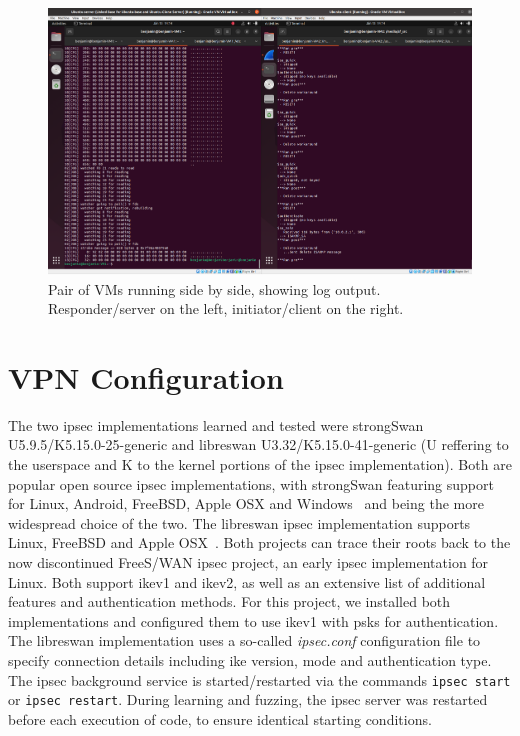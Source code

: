 \begin{figure}
	\centering
	\includegraphics[width=\linewidth]{images/VM_setup}
	\caption{Pair of VMs running side by side, showing log output. Responder/server on the left, initiator/client on the right.}
	\label{fig:vmsetup}
\end{figure}


\section{VPN Configuration} \label{sec:vpn_setup}
The two \ac{ipsec} implementations learned and tested were strongSwan U5.9.5/K5.15.0-25-generic and libreswan U3.32/K5.15.0-41-generic (U reffering to the userspace and K to the kernel portions of the ipsec implementation). Both are popular open source \ac{ipsec} implementations, with strongSwan featuring support for Linux, Android, FreeBSD, Apple OSX and Windows~\cite{doc:strongswan} and being the more widespread choice of the two. The libreswan \ac{ipsec} implementation supports Linux, FreeBSD and Apple OSX~\cite{doc:libreswan}. Both projects can trace their roots back to the now discontinued FreeS/WAN \ac{ipsec} project, an early \ac{ipsec} implementation for Linux. Both support \ac{ike}v1 and \ac{ike}v2, as well as an extensive list of additional features and authentication methods. For this project, we installed both implementations and configured them to use \ac{ike}v1 with \acp{psk} for authentication. The libreswan implementation uses a so-called \emph{ipsec.conf} configuration file to specify connection details including \ac{ike} version, mode and authentication type. The \ac{ipsec} background service is started/restarted via the commands \texttt{ipsec start} or \texttt{ipsec restart}. During learning and fuzzing, the \ac{ipsec} server was restarted before each execution of code, to ensure identical starting conditions.

